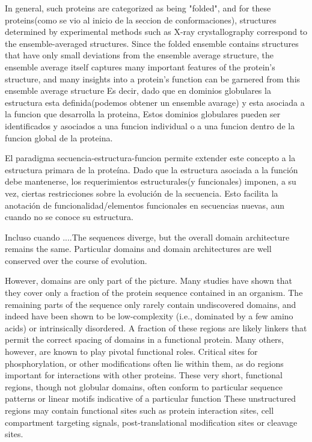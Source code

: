 In general, such proteins are categorized as being "folded", and for these proteins(como se vio al inicio de la seccion de conformaciones), 
structures determined by experimental methods such as X-ray crystallography correspond to the ensemble-averaged structures.
Since the folded ensemble contains structures that have only small deviations from the ensemble average structure, 
the ensemble average itself captures many important features of the protein's structure, and many insights into a protein's function can be garnered from this
ensemble average structure
Es decir, dado que en dominios globulares la estructura esta definida(podemos obtener un ensemble avarage) y esta asociada a la funcion que desarrolla la proteina, 
Estos dominios globulares pueden ser identificados y asociados a una funcion individual o a una funcion dentro de la funcion global de la proteina.

El paradigma secuencia-estructura-funcion permite extender este concepto a la estructura primara de la proteína.
Dado que la estructura asociada a la función debe mantenerse, los requerimientos estructurales(y funcionales) imponen, a su vez, ciertas restricciones sobre la evolución de la secuencia.
Esto facilita la anotación de funcionalidad/elementos funcionales en secuencias nuevas, aun cuando no se conoce su estructura.

Incluso cuando ....The sequences diverge, but the overall domain architecture remains the same.
Particular domains and domain architectures are well conserved over the course of evolution. 









However, domains are only part of the picture. 
Many studies have shown that they cover only a fraction of the protein sequence contained in an organism. 
The remaining parts of the sequence only rarely contain undiscovered domains, and indeed have been shown to be low-complexity (i.e., dominated by a few amino acids) or intrinsically disordered.
A fraction of these regions are likely linkers that permit the correct spacing of domains in a functional protein.
Many others, however, are known to play pivotal functional roles. 
Critical sites for phosphorylation, or other modifications often lie within them, as do regions important for interactions with other proteins. 
These very short, functional regions, though not globular domains, often conform to particular sequence patterns or linear motifs indicative of a particular function
These unstructured regions may contain functional sites such as protein interaction sites, cell compartment targeting signals, post-translational modification sites or cleavage sites. 

